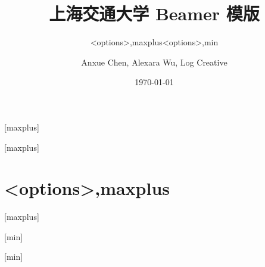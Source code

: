 \documentclass[
    aspectratio=169
]{ctexbeamer}
\begin{document}
\title[SJTU Beamer Template] %
{\textbf{上海交通大学 Beamer 模版}} %

\author[Anxue Chen, Alexara Wu, Log Creative]
{Anxue Chen, Alexara Wu, Log Creative}


\date{\today}

\subtitle{<options>,maxplus}
\logo{\resizebox{!}{0.7cm}{\cnlogo}}
[maxplus]
\maketitle
{}[maxplus]
\part{<options>,maxplus}
[maxplus]
\makebottom

\subtitle{<options>,min}
\logo{\resizebox{!}{0.7cm}{\enlogo}}
[min]
\maketitle
{}[min]
\end{document}
